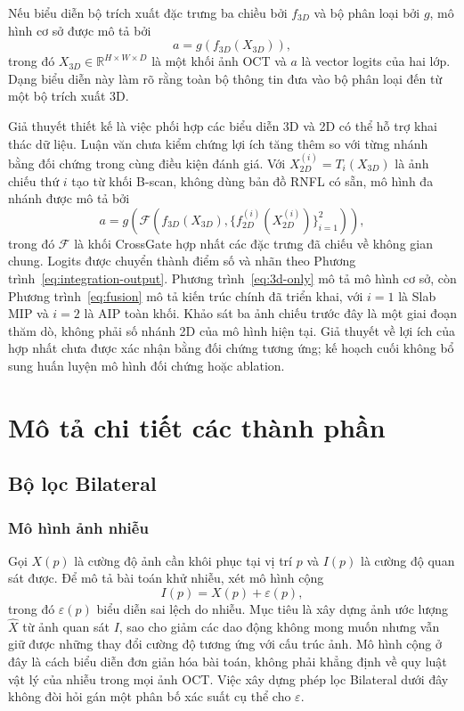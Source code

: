 \documentclass[14pt,a4paper,oneside]{extreport}
\begin{document}
Nếu biểu diễn bộ trích xuất đặc trưng ba chiều bởi $f_{3D}$ và bộ phân loại bởi
$g$, mô hình cơ sở được mô tả bởi
\begin{equation}
  a=g\!\left(f_{3D}(X_{3D})\right),
  \label{eq:3d-only}
\end{equation}
trong đó $X_{3D}\in\mathbb{R}^{H\times W\times D}$ là một khối ảnh OCT và
$a$ là vector logits của hai lớp. Dạng biểu diễn này làm rõ rằng
toàn bộ thông tin đưa vào bộ phân loại đến từ một bộ trích xuất 3D.

Giả thuyết thiết kế là việc phối hợp các biểu diễn 3D và 2D có thể
hỗ trợ khai thác dữ liệu. Luận văn chưa kiểm chứng lợi ích tăng thêm
so với từng nhánh bằng đối chứng trong cùng điều kiện đánh giá. Với
$X_{2D}^{(i)}=T_i(X_{3D})$ là ảnh chiếu thứ $i$ tạo từ khối B-scan,
không dùng bản đồ RNFL có sẵn, mô hình đa nhánh được mô tả bởi
\begin{equation}
  a=g\!\left(
    \mathcal{F}\!\left(f_{3D}(X_{3D}),
    \{f_{2D}^{(i)}(X_{2D}^{(i)})\}_{i=1}^{2}\right)
  \right),
  \label{eq:fusion}
\end{equation}
trong đó $\mathcal{F}$ là khối CrossGate hợp nhất các đặc trưng đã
chiếu về không gian chung. Logits được chuyển thành điểm số và nhãn
theo Phương trình~\eqref{eq:integration-output}. Phương trình~\eqref{eq:3d-only} mô tả mô hình
cơ sở, còn Phương trình~\eqref{eq:fusion} mô tả kiến trúc chính đã
triển khai, với $i=1$ là Slab MIP và $i=2$ là AIP toàn khối.
Khảo sát ba ảnh chiếu trước đây là một giai đoạn thăm dò, không phải
số nhánh 2D của mô hình hiện tại. Giả thuyết về lợi ích của hợp nhất
chưa được xác nhận bằng đối chứng tương ứng; kế hoạch cuối không bổ
sung huấn luyện mô hình đối chứng hoặc ablation.

\section{Mô tả chi tiết các thành phần}
\label{sec:method-components}
\subsection{Bộ lọc Bilateral}
\label{sec:bilateral-selected}
\subsubsection{Mô hình ảnh nhiễu}
Gọi $X(p)$ là cường độ ảnh cần khôi phục tại vị trí $p$ và $I(p)$ là
cường độ quan sát được. Để mô tả bài toán khử nhiễu, xét mô hình cộng
\begin{equation}
 I(p)=X(p)+\varepsilon(p),
 \label{eq:bilateral-noise-model}
\end{equation}
trong đó $\varepsilon(p)$ biểu diễn sai lệch do nhiễu. Mục tiêu là xây
dựng ảnh ước lượng $\widehat X$ từ ảnh quan sát $I$, sao cho giảm các
dao động không mong muốn nhưng vẫn giữ được những thay đổi cường độ
tương ứng với cấu trúc ảnh. Mô hình cộng ở đây là cách biểu diễn đơn
giản hóa bài toán, không phải khẳng định về quy luật vật lý của nhiễu
trong mọi ảnh OCT. Việc xây dựng phép lọc Bilateral dưới đây không
đòi hỏi gán một phân bố xác suất cụ thể cho $\varepsilon$.
\end{document}
